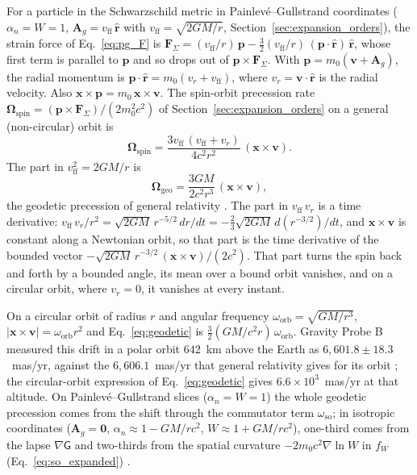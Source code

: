 \documentclass[aps,prd,onecolumn,tightenlines,nofootinbib,notitlepage,11pt,floatfix]{revtex4-2}
\theoremstyle{indentedtheorem}
\begin{document}
For a particle in the Schwarzschild metric in Painlev\'e--Gullstrand coordinates ($\alpha_n=W=1$, $\mathbf{A}_g=v_\text{ff}\,\hat{\mathbf{r}}$ with $v_\text{ff}=\sqrt{2GM/r}$, Section~\ref{sec:expansion_orders}), the strain force of Eq.~\eqref{eq:pg_F} is $\mathbf{F}_\Sigma=(v_\text{ff}/r)\,\mathbf{p}-\tfrac{3}{2}(v_\text{ff}/r)\,(\mathbf{p}\cdot\hat{\mathbf{r}})\,\hat{\mathbf{r}}$, whose first term is parallel to $\mathbf{p}$ and so drops out of $\mathbf{p}\times\mathbf{F}_\Sigma$. With $\mathbf{p}=m_0(\mathbf{v}+\mathbf{A}_g)$, the radial momentum is $\mathbf{p}\cdot\hat{\mathbf{r}}=m_0(v_r+v_\text{ff})$, where $v_r=\mathbf{v}\cdot\hat{\mathbf{r}}$ is the radial velocity. Also $\mathbf{x}\times\mathbf{p}=m_0\,\mathbf{x}\times\mathbf{v}$. The spin-orbit precession rate $\boldsymbol{\Omega}_\text{spin}=(\mathbf{p}\times\mathbf{F}_\Sigma)/(2m_0^2c^2)$ of Section~\ref{sec:expansion_orders} on a general (non-circular) orbit is
\begin{equation}
    \boldsymbol{\Omega}_\text{spin} = \frac{3v_\text{ff} \, (v_\text{ff}+v_r)}{4c^2r^2} \, (\mathbf{x}\times\mathbf{v}) .
    \label{eq:pg_rate}
\end{equation}
The part in $v_\text{ff}^2=2GM/r$ is
\begin{equation}
    \boldsymbol{\Omega}_\text{geo} = \frac{3GM}{2c^2r^3} \, (\mathbf{x}\times\mathbf{v}) ,
    \label{eq:geodetic}
\end{equation}
the geodetic precession of general relativity \citep{deSitter1916Einstein,Fokker1920Geodesic,Everitt2011Gravity}. The part in $v_\text{ff} \, v_r$ is a time derivative: $v_\text{ff} \, v_r/r^2=\sqrt{2GM} \, r^{-5/2} \, dr/dt=-\tfrac{2}{3}\sqrt{2GM} \, d(r^{-3/2})/dt$, and $\mathbf{x}\times\mathbf{v}$ is constant along a Newtonian orbit, so that part is the time derivative of the bounded vector $-\sqrt{2GM} \, r^{-3/2} \, (\mathbf{x}\times\mathbf{v})/(2c^2)$. That part turns the spin back and forth by a bounded angle, its mean over a bound orbit vanishes, and on a circular orbit, where $v_r=0$, it vanishes at every instant.

On a circular orbit of radius $r$ and angular frequency $\omega_\text{orb}=\sqrt{GM/r^3}$, $|\mathbf{x}\times\mathbf{v}|=\omega_\text{orb}r^2$ and Eq.~\eqref{eq:geodetic} is $\tfrac{3}{2}(GM/c^2r) \, \omega_\text{orb}$. Gravity Probe B measured this drift in a polar orbit $642$~km above the Earth as $6{,}601.8\pm18.3$~mas/yr, against the $6{,}606.1$~mas/yr that general relativity gives for its orbit \citep{Everitt2011Gravity}; the circular-orbit expression of Eq.~\eqref{eq:geodetic} gives $6.6\times10^{3}$~mas/yr at that altitude. On Painlev\'e--Gullstrand slices ($\alpha_n=W=1$) the whole geodetic precession comes from the shift through the commutator term $\omega_\text{so}$; in isotropic coordinates ($\mathbf{A}_g=\mathbf{0}$, $\alpha_n\approx1-GM/rc^2$, $W\approx1+GM/rc^2$), one-third comes from the lapse $\nabla\mathsf{G}$ and two-thirds from the spatial curvature $-2m_0c^2\nabla\ln W$ in $f_W$ (Eq.~\eqref{eq:so_expanded}) \citep{ObukhovSilenkoTeryaev2009Spin,ObukhovSilenkoTeryaev2011Dirac}.
\end{document}
